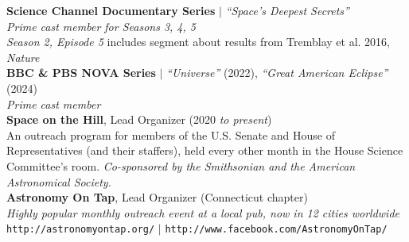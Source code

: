 \documentclass[11pt]{article}
\begin{document}
{\textbf{Science Channel Documentary Series} $|$ \textit{``Space's Deepest Secrets''} \\
\textit{Prime cast member for Seasons 3, 4, 5}\\
\textit{Season 2, Episode 5} includes segment about results from Tremblay et al. 2016, \textit{Nature}\\


\textbf{BBC \& PBS NOVA Series} $|$ \textit{``Universe''} (2022), \textit{``Great American Eclipse''} (2024)  \\
\textit{Prime cast member}\\




\textbf{Space on the Hill}, Lead Organizer (2020 \textit{to present}) \\
An outreach program for members of the U.S. Senate and House of Representatives (and their staffers), held every other month in the House Science Committee's room. \textit{ Co-sponsored by the Smithsonian and the American Astronomical Society.}\\

\textbf{Astronomy On Tap}, Lead Organizer (Connecticut chapter) \\
\textit{Highly popular monthly outreach event at a local pub, now in 12 cities worldwide} \\
{\footnotesize \texttt{http://astronomyontap.org/}} $|$ {\footnotesize \texttt{http://www.facebook.com/AstronomyOnTap/}} \\


}
\end{document}
